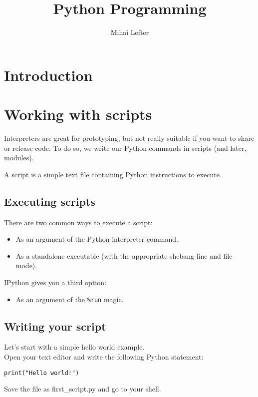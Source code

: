 \documentclass[aspectratio=1610,slidestop]{beamer}
\author{Mihai Lefter}
\title{Python Programming}
\newenvironment{pythonfile}[1]
 {\begin{tcolorbox}[title=#1,
                    title filled=false,
                    coltitle=LUMCDonkerblauw,
                    fonttitle=\scriptsize,
                    fontupper=\footnotesize,
                    enhanced,
                    drop small lifted shadow,
                    boxrule=0.1mm,
                    leftrule=5mm,
                    rulecolor=white,
                    left=0.1cm,
                    colback=white!92!black,
                    colframe=scriptback]}
 {\end{tcolorbox}}
\begin{document}


\section{Introduction}
\makeTableOfContents


\section{Working with scripts}

\begin{pframe}
 Interpreters are great for prototyping, but not really suitable if you want to
 share or release code. To do so, we write our Python commands in scripts (and
 later, modules).

 A script is a simple text file containing Python instructions to execute.
\end{pframe}


\subsection{Executing scripts}
\begin{pframe}
 There are two common ways to execute a script:
  \begin{itemize}
   \item As an argument of the Python interpreter command.
   \item As a standalone executable (with the appropriate shebang line and
   file mode).
  \end{itemize}
  \medskip

  IPython gives you a third option:
  \begin{itemize}
   \item As an argument of the \texttt{\%run} magic.
  \end{itemize}
\end{pframe}


\subsection{Writing your script}
\begin{pframe}
 Let's start with a simple hello world example.\\
 
 Open your text editor and write the following Python statement:

 \begin{pythonfile}{first\_script.py}
  \begin{verbatim}
print("Hello world!")
  \end{verbatim}
 \end{pythonfile}
Save the file as first\_script.py and go to your shell.
\end{pframe}
\end{document}
